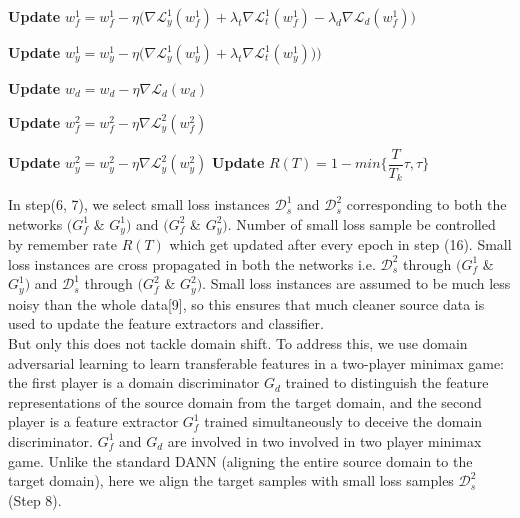 \begin{algorithm}[H]
\begin{algorithmic}[1]
				    \State \textbf{Update} $w_{f}^1 = w_{f}^1 - \eta \big( \nabla \mathcal{L}_{y}^1(w_{f}^1) + \lambda_t \nabla \mathcal{L}_{t}^1(w_{f}^1) - \lambda_d \nabla \mathcal{L}_{d}(w_{f}^1)\big)$
				    
				    \State \textbf{Update} $w_{y}^1 = w_{y}^1 - \eta \big(\nabla \mathcal{L}_{y}^1(w_{y}^1)+ \lambda_t \nabla\mathcal{L}_{t}^1(w_{y}^1))\big)$
				    
				    \State \textbf{Update} $w_{d} = w_{d} - \eta \nabla \mathcal{L}_{d}(w_{d})$
				    
				    \State \textbf{Update} $w_{f}^2 = w_{f}^2 - \eta \nabla \mathcal{L}_{y}^2(w_{f}^2)$
				    
				    \State \textbf{Update} $w_{y}^2 = w_{y}^2 - \eta \nabla \mathcal{L}_{y}^2(w_{y}^2)$
			    \EndFor
			 \State \textbf{Update} $R(T)= 1- min\bigg\{\dfrac{T}{T_k}\tau, \tau\bigg\}$
	\EndFor
	\end{algorithmic} 
\end{algorithm}
 In step(6, 7), we select small loss instances $\mathcal{D}_{s}^1$ and $\mathcal{D}_{s}^2$ corresponding to both the networks $(G_{f}^1$ \& $G_{y}^1)$ and $(G_{f}^2$ \& $G_{y}^2)$. Number of small loss sample be controlled by remember rate $R(T)$ which get updated after every epoch in step (16). Small loss instances are cross propagated in both the networks i.e. $\mathcal{D}_{s}^2$ through $(G_{f}^1$ \& $G_{y}^1)$ and $\mathcal{D}_{s}^1$ through $(G_{f}^2$ \& $G_{y}^2)$. Small loss instances are assumed to be much less noisy than the whole data[9], so this ensures that much cleaner source data is used to update the feature extractors and classifier.\\
 But only this does not tackle domain shift. To address this, we use domain adversarial learning\cite{dann} to learn transferable features in a two-player minimax game: the first player is a domain discriminator $G_d$ trained to distinguish
the feature representations of the source domain from the target domain, and the second player is a feature extractor $G_{f}^1$ trained simultaneously to deceive the domain discriminator. $G_{f}^1$ and $G_d$ are involved in two involved in two player minimax game. Unlike the standard DANN (aligning the entire source domain to the target domain), here we align the target samples with small loss samples $\mathcal{D}_{s}^2$ (Step 8).
